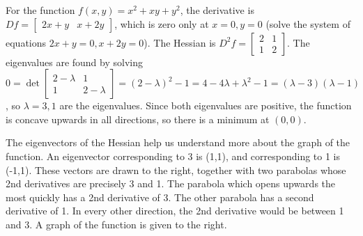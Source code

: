 \begin{example}
For the function {$f(x,y)=x^2+xy+y^2$}, the derivative is $Df = \begin{bmatrix}2x+y&x+2y \end{bmatrix}$, which is zero only at $x=0,y=0$ (solve the system of equations $2x+y=0,x+2y=0$). 
The Hessian is $D^2f = \begin{bmatrix}2&1 \\1&2\end{bmatrix}$. The eigenvalues are found by solving $0=\det \begin{bmatrix}2-\lambda &1 \\1&2-\lambda \end{bmatrix} = (2-\lambda)^2-1 = 4-4\lambda+\lambda^2 -1 = (\lambda-3)(\lambda-1)$, so $\lambda = 3,1$ are the eigenvalues.  Since both eigenvalues are positive, the function is concave upwards in all directions, so there is a minimum at $(0,0)$.  

The eigenvectors of the Hessian help us understand more about the graph of the function.  An eigenvector corresponding to 3 is (1,1), and corresponding to 1 is (-1,1). These vectors are drawn to the right, together with two parabolas whose 2nd derivatives are precisely 3 and 1.  The parabola which opens upwards the most quickly has a 2nd derivative of 3.  The other parabola has a second derivative of 1. In every other direction, the 2nd derivative would be between 1 and 3. A graph of the function is given to the right.
\end{example}

